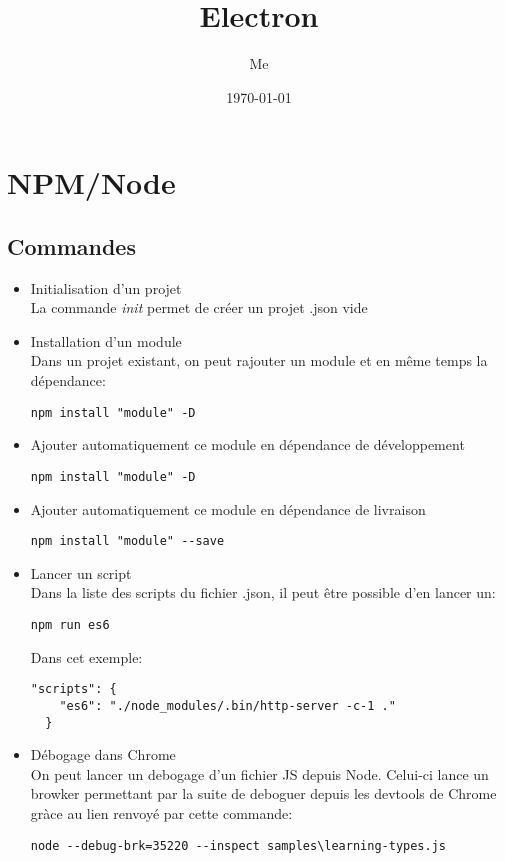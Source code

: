 \documentclass[12pt,oneside]{scrbook}
\title{Electron}
\author{Me}
\date{\today}
\begin{document}
 
\maketitle 
\tableofcontents



\chapter{NPM/Node}
\section{Commandes}
\begin{itemize}
\item Initialisation d'un projet\\
La commande \textit{init} permet de créer un projet .json vide
\item Installation d'un module\\
Dans un projet existant, on peut rajouter un module et en même temps la dépendance:
\begin{verbatim}
npm install "module" -D
\end{verbatim}
\item Ajouter automatiquement ce module en dépendance de développement
\begin{verbatim}
npm install "module" -D
\end{verbatim}
\item Ajouter automatiquement ce module en dépendance de livraison
\begin{verbatim}
npm install "module" --save
\end{verbatim}
\item Lancer un script\\
Dans la liste des scripts du fichier .json, il peut être possible d'en lancer un:
\begin{verbatim}
npm run es6
\end{verbatim}
Dans cet exemple:
\begin{verbatim}
"scripts": {
    "es6": "./node_modules/.bin/http-server -c-1 ."
  }
\end{verbatim}
\item Débogage dans Chrome\\
On peut lancer un debogage d'un fichier JS depuis Node. Celui-ci lance un browker permettant par la suite de deboguer depuis les devtools de Chrome gràce au lien renvoyé par cette commande:
\begin{verbatim}
node --debug-brk=35220 --inspect samples\learning-types.js
\end{verbatim}
\end{itemize}


\backmatter 

\printindex 
\end{document}
